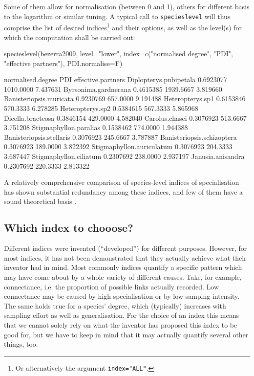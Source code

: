 \documentclass[a4paper, 11pt]{article}\usepackage[]{graphicx}\usepackage[]{color}
\begin{document}
\noindent Some of them allow for normalisation (between 0 and 1), others for different basis to the logarithm or similar tuning. A typical call to \texttt{specieslevel} will thus comprise the list of desired indices\footnote{Or alternatively the argument \texttt{index="ALL"}.} and their options, as well as the level(s) for which the computation shall be carried out:
\begin{Schunk}
\begin{Sinput}
specieslevel(bezerra2009, level="lower", index=c("normalised degree", "PDI", 
      "effective partners"), PDI.normalise=F)
\end{Sinput}
\begin{Soutput}
                           normalised.degree       PDI effective.partners
Diplopterys.pubipetala             0.6923077 1010.0000           7.437631
Byrsonima.gardnerana               0.4615385 1939.6667           3.819660
Banisteriopsis.muricata            0.9230769  657.0000           9.191488
Heteropterys.sp1                   0.6153846  570.3333           6.278285
Heteropterys.sp2                   0.5384615  567.3333           5.865968
Dicella.bracteosa                  0.3846154  429.0000           4.582040
Carolus.chasei                     0.3076923  513.6667           3.751208
Stigmaphyllon.paralias             0.1538462  774.0000           1.944388
Banisteriopsis.stellaris           0.3076923  245.6667           3.787887
Banisteriopsis.schizoptera         0.3076923  189.0000           3.822392
Stigmaphyllon.auriculatum          0.3076923  204.3333           3.687447
Stigmaphyllon.ciliatum             0.2307692  238.0000           2.937197
Janusia.anisandra                  0.2307692  220.3333           2.813322
\end{Soutput}
\end{Schunk}
A relatively comprehensive comparison of species-level indices of specialisation \citep{Dormann2011} has shown substantial redundancy among these indices, and few of them have a sound theoretical basis \cite{Poisot2012a}.



\subsection{Which index to chooose?}%
Different indices were invented (``developed'') for different purposes. However, for most indices, it has not been demonstrated that they actually achieve what their inventor had in mind. Most commonly indices quantify a specific pattern which may have come about by a whole variety of different causes. Take, for example, connectance, i.e. the proportion of possible links actually recorded. Low connectance may be caused by high specialisation or by low samplng intensity. The same holds true for a species' degree, which (typically) increases with sampling effort as well as generalisation. For the choice of an index this means that we cannot solely rely on what the inventor has proposed this index to be good for, but we have to keep in mind that it may actually quantify several other things, too.
\end{document}
